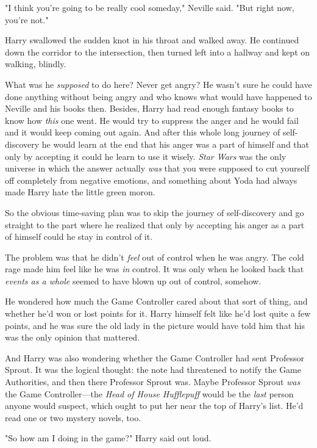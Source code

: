 "I think you're going to be really cool someday," Neville said. "But right now,
you're not."

Harry swallowed the sudden knot in his throat and walked away. He continued
down the corridor to the intersection, then turned left into a hallway and kept
on walking, blindly.

What was he \emph{supposed} to do here? Never get angry? He wasn't sure he
could have done anything without being angry and who knows what would have
happened to Neville and his books then. Besides, Harry had read enough fantasy
books to know how \emph{this} one went. He would try to suppress the anger and
he would fail and it would keep coming out again. And after this whole long
journey of self-discovery he would learn at the end that his anger was a part
of himself and that only by accepting it could he learn to use it wisely.
\emph{Star Wars} was the only universe in which the answer actually \emph{was}
that you were supposed to cut yourself off completely from negative emotions,
and something about Yoda had always made Harry hate the little green moron.

So the obvious time-saving plan was to skip the journey of self-discovery and
go straight to the part where he realized that only by accepting his anger as a
part of himself could he stay in control of it.

The problem was that he didn't \emph{feel} out of control when he was angry.
The cold rage made him feel like he was \emph{in} control. It was only when he
looked back that \emph{events as a whole} seemed to have{\el} blown up out
of control, somehow.

He wondered how much the Game Controller cared about that sort of thing, and
whether he'd won or lost points for it. Harry himself felt like he'd lost quite
a few points, and he was sure the old lady in the picture would have told him
that his was the only opinion that mattered.

And Harry was also wondering whether the Game Controller had sent Professor
Sprout. It was the logical thought: the note had threatened to notify the Game
Authorities, and then there Professor Sprout was. Maybe Professor Sprout
\emph{was} the Game Controller—the \emph{Head of House Hufflepuff} would be
the \emph{last} person anyone would suspect, which ought to put her near the
top of Harry's list. He'd read one or two mystery novels, too.

"So how am I doing in the game?" Harry said out loud.

